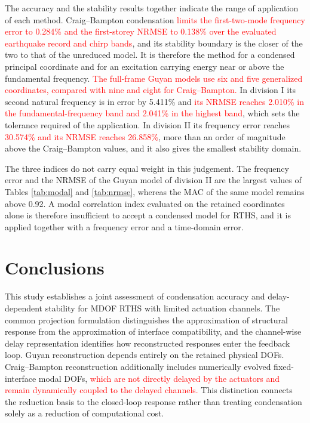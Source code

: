 \documentclass[a4paper,fleqn,review,12pt]{cas-sc}
\numberwithin{equation}{section}
\newcommand{\rev}[1]{\textcolor{red}{#1}}
\begin{document}
The accuracy and the stability results together indicate the range of application of each method. Craig--Bampton condensation \rev{limits the first-two-mode frequency error to 0.284\% and the first-storey NRMSE to 0.138\% over the evaluated earthquake record and chirp bands}, and its stability boundary is the closer of the two to that of the unreduced model. It is therefore the method for a condensed principal coordinate and for an excitation carrying energy near or above the fundamental frequency. \rev{The full-frame Guyan models use six and five generalized coordinates, compared with nine and eight for Craig--Bampton.} In division I its second natural frequency is in error by 5.411\% and \rev{its NRMSE reaches 2.010\% in the fundamental-frequency band and 2.041\% in the highest band}, which sets the tolerance required of the application. In division II its frequency error reaches \rev{30.574\% and its NRMSE reaches 26.858\%}, more than an order of magnitude above the Craig--Bampton values, and it also gives the smallest stability domain.

The three indices do not carry equal weight in this judgement. The frequency error and the NRMSE of the Guyan model of division II are the largest values of Tables \ref{tab:modal} and \ref{tab:nrmse}, whereas the MAC of the same model remains above 0.92. A modal correlation index evaluated on the retained coordinates alone is therefore insufficient to accept a condensed model for RTHS, and it is applied together with a frequency error and a time-domain error.




\section{Conclusions} \label{sec6}

This study establishes a joint assessment of condensation accuracy and delay-dependent stability for MDOF RTHS with limited actuation channels. The common projection formulation distinguishes the approximation of structural response from the approximation of interface compatibility, and the channel-wise delay representation identifies how reconstructed responses enter the feedback loop. Guyan reconstruction depends entirely on the retained physical DOFs. Craig--Bampton reconstruction additionally includes numerically evolved fixed-interface modal DOFs, \rev{which are not directly delayed by the actuators and remain dynamically coupled to the delayed channels.} This distinction connects the reduction basis to the closed-loop response rather than treating condensation solely as a reduction of computational cost.
\end{document}
